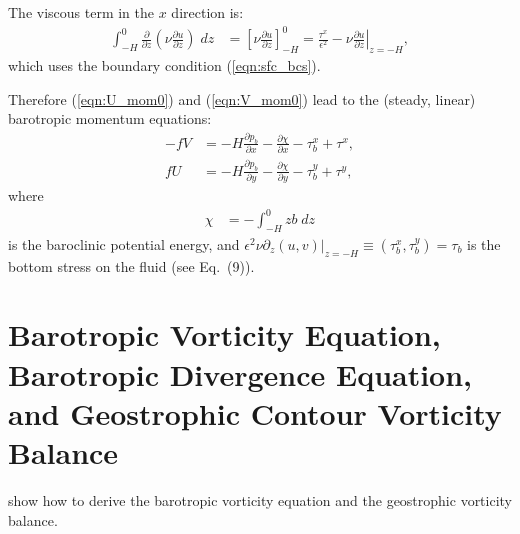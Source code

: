 \documentclass[10pt]{amsart}
\begin{document}
 The viscous term in the $x$ direction is:
 \begin{align}
  \int_{-H}^{0} \frac{\partial}{\partial z} \left( \nu \frac{\partial u}{\partial z} \right) \; dz & = \left[  \nu \frac{\partial u}{\partial z}  \right]_{-H}^{0}  = \frac{\tau^x}{ \epsilon^2}  - \left. \nu \frac{\partial u}{\partial z} \right|_{z = -H} ,
 \end{align}
which uses the boundary condition (\ref{eqn:sfc_bcs}).
  
 Therefore (\ref{eqn:U_mom0}) and (\ref{eqn:V_mom0}) lead to the (steady, linear) barotropic momentum equations:
 \begin{align}
- f V & =  - H \frac{\partial p_b}{\partial x} - \frac{\partial \chi}{\partial x}  - \tau^x_b + \tau^x , \label{eqn:U_mom} \\
f  U & = - H \frac{\partial p_b}{\partial y} - \frac{\partial \chi }{\partial y}  - \tau^y_b + \tau^y \label{eqn:V_mom} ,
\end{align}
where
\begin{align}
\chi & = - \int_{-H}^0 z b \; dz
\label{eqn:baroclinic_PE}
\end{align}
is the baroclinic potential energy, and $\epsilon^2  \nu \left. \partial_z (u,v) \right|_{z = -H}  \equiv (\tau^x_b, \tau^y_b) = \tau_b$ is the bottom stress on the fluid (see \citealt{waldman&giordani23} Eq.~(9)).


\section{Barotropic Vorticity Equation, Barotropic Divergence Equation, and Geostrophic Contour Vorticity Balance}
\citet{waldman&giordani23} show how to derive the barotropic vorticity equation and the geostrophic vorticity balance.
\end{document}
